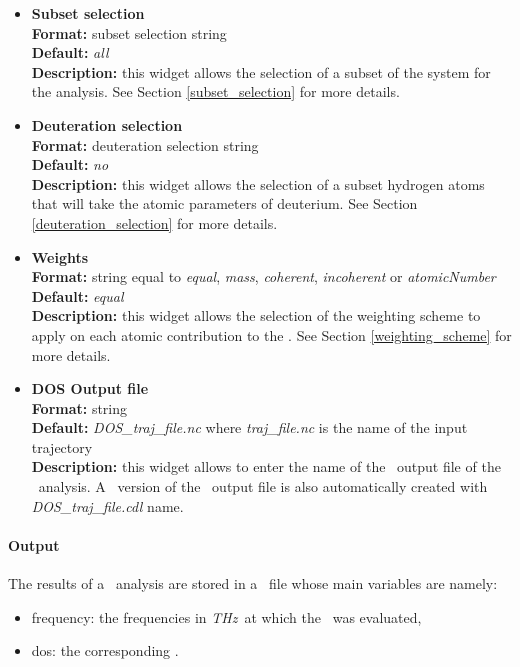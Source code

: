 \documentclass[a4paper,11pt]{report}
\newcommand{\thz}{\textit{THz}}
\begin{document}
\begin{itemize}
\hypertarget{dos_subset_selection}{}
\item \textbf{Subset selection}\\
\textbf{Format:} subset selection string\\
\textbf{Default:} \textit{all}\\
\textbf{Description:} this widget allows the selection of a subset of the system for the analysis. 
See Section \ref{subset_selection} for more details.

\hypertarget{dos_deuteration_selection}{}
\item \textbf{Deuteration selection}\\
\textbf{Format:} deuteration selection string\\
\textbf{Default:} \textit{no}\\
\textbf{Description:} this widget allows the selection of a subset hydrogen atoms that will take the atomic parameters 
of deuterium. See Section \ref{deuteration_selection} for more details.

\hypertarget{dos_weights}{}
\item \textbf{Weights}\\
\textbf{Format:} string equal to \textit{equal}, \textit{mass}, \textit{coherent}, \textit{incoherent} or \textit{atomicNumber}\\
\textbf{Default:} \textit{equal}\\
\textbf{Description:} this widget allows the selection of the weighting scheme to apply on each atomic contribution 
to the \DOS. See Section \ref{weighting_scheme} for more details. 

\hypertarget{dos_dos_output_file}{}
\item \textbf{DOS Output file}\\
\textbf{Format:} string\\
\textbf{Default:} \textit{DOS\_traj\_file.nc} where \textit{traj\_file.nc} is the name of the input trajectory\\
\textbf{Description:} this widget allows to enter the name of the \NetCDF\ output file of the \DOS\ analysis. A \CDL\ 
version of the \NetCDF\ output file is also automatically created with \textit{DOS\_traj\_file.cdl} name.
\end{itemize}

\paragraph{Output\\}
The results of a \DOS\ analysis are stored in a \NetCDF\ file whose main variables are namely:
\begin{itemize}
\item frequency: the frequencies in \thz\ at which the \DOS\ was evaluated,
\item dos: the corresponding \DOS .
\end{itemize}
\end{document}
